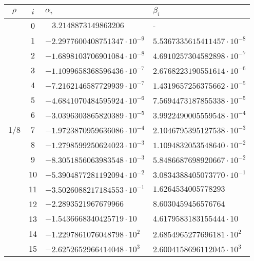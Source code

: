 \begin{longtable}{ccll}
\toprule
$\rho$ &$i$ &  \hspace{2cm}$\alpha_{i}$ &  \hspace{2cm}$\beta_{i}$ \\ 
\midrule
  & 0 & $\hspace{10pt} 3.2148873149863206$ & \hspace{2cm}- \\ 
  & 1 & $-2.2977600408751347\cdot 10^{-9}$ & $5.5367335615411457\cdot 10^{-8}$ \\ 
  & 2 & $-1.6898103706901084\cdot 10^{-8}$ & $4.6910257304582898\cdot 10^{-7}$ \\ 
  & 3 & $-1.1099658368596436\cdot 10^{-7}$ & $2.6768223190551614\cdot 10^{-6}$ \\ 
  & 4 & $-7.2162146587729939\cdot 10^{-7}$ & $1.4319657256375662\cdot 10^{-5}$ \\ 
  & 5 & $-4.6841070484595924\cdot 10^{-6}$ & $7.5694473187855338\cdot 10^{-5}$ \\ 
  & 6 & $-3.0396303865820389\cdot 10^{-5}$ & $3.9922490005559548\cdot 10^{-4}$ \\ 
1/8  & 7 & $-1.9723870959636086\cdot 10^{-4}$ & $2.1046795395127538\cdot 10^{-3}$ \\ 
  & 8 & $-1.2798599250624023\cdot 10^{-3}$ & $1.1094832053548640\cdot 10^{-2}$ \\ 
  & 9 & $-8.3051856063983548\cdot 10^{-3}$ & $5.8486687698920667\cdot 10^{-2}$ \\ 
  & 10 & $-5.3904877281192094\cdot 10^{-2}$ & $3.0834388405073770\cdot 10^{-1}$ \\ 
  & 11 & $-3.5026088217184553\cdot 10^{-1}$ & $1.6264534005778293$ \\ 
  & 12 & $-2.2893521967679966$ & $8.6030459456576764$ \\ 
  & 13 & $-1.5436668340425719\cdot 10 $& $4.6179583183155444\cdot 10$ \\ 
  & 14 & $-1.2297861076048798\cdot 10^{2}$ & $2.6854965277696181\cdot 10^{2}$ \\ 
  & 15 & $-2.6252652966414048\cdot 10^{3} $& $2.6004158696112045\cdot 10^{3} $\\ 

\end{longtable}

